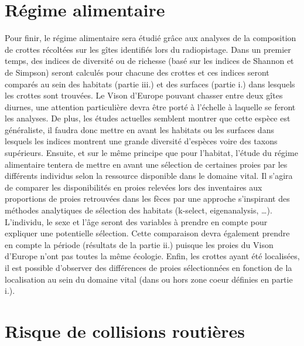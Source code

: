 \documentclass[
  letterpaper,
  DIV=11,
  numbers=noendperiod]{scrreprt}
\begin{document}
\section{Régime alimentaire}\label{ruxe9gime-alimentaire}

Pour finir, le régime alimentaire sera étudié grâce aux analyses de la
composition de crottes récoltées sur les gîtes identifiés lors du
radiopistage. Dans un premier temps, des indices de diversité ou de
richesse (basé sur les indices de Shannon et de Simpson) seront calculés
pour chacune des crottes et ces indices seront comparés au sein des
habitats (partie iii.) et des surfaces (partie i.) dans lesquels les
crottes sont trouvées. Le Vison d'Europe pouvant chasser entre deux
gîtes diurnes, une attention particulière devra être porté à l'échelle à
laquelle se feront les analyses. De plus, les études actuelles semblent
montrer que cette espèce est généraliste, il faudra donc mettre en avant
les habitats ou les surfaces dans lesquels les indices montrent une
grande diversité d'espèces voire des taxons supérieurs. Ensuite, et sur
le même principe que pour l'habitat, l'étude du régime alimentaire
tentera de mettre en avant une sélection de certaines proies par les
différents individus selon la ressource disponible dans le domaine
vital. Il s'agira de comparer les disponibilités en proies relevées lors
des inventaires aux proportions de proies retrouvées dans les fèces par
une approche s'inspirant des méthodes analytiques de sélection des
habitats (k-select, eigenanalysis, \ldots). L'individu, le sexe et l'âge
seront des variables à prendre en compte pour expliquer une potentielle
sélection. Cette comparaison devra également prendre en compte la
période (résultats de la partie ii.) puisque les proies du Vison
d'Europe n'ont pas toutes la même écologie. Enfin, les crottes ayant été
localisées, il est possible d'observer des différences de proies
sélectionnées en fonction de la localisation au sein du domaine vital
(dans ou hors zone coeur définies en partie i.).

\section{Risque de collisions
routières}\label{risque-de-collisions-routiuxe8res}
\end{document}
